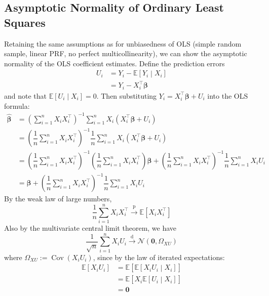 \documentclass[11pt]{report} %
\begin{document}
\subsection{Asymptotic Normality of Ordinary Least Squares}

Retaining the same assumptions as for unbiasedness of OLS (simple random sample, linear PRF, no perfect multicollinearity), we can show the asymptotic normality of the OLS coefficient estimates. Define the prediction errors
\begin{align}
U_{i} &= Y_{i} - \mathbb{E}\left[Y_{i}\middle| X_{i}\right] \\
&= Y_{i} - X_{i}^{\top}\boldsymbol{\beta}
\end{align}
and note that $\mathbb{E}\left[U_{i}\middle| X_{i}\right] = 0$. Then substituting $Y_{i} = X_{i}^{\top}\boldsymbol{\beta} + U_{i}$ into the OLS formula:
\begin{align}
\widehat{\boldsymbol{\beta}} &= \left(\sum_{i=1}^{n}X_{i}X_{i}^{\top}\right)^{-1}\sum_{i=1}^{n}X_{i}\left(X_{i}^{\top}\boldsymbol{\beta}+U_{i}\right) \\
&= \left(\dfrac{1}{n}\sum_{i=1}^{n}X_{i}X_{i}^{\top}\right)^{-1}\dfrac{1}{n}\sum_{i=1}^{n}X_{i}\left(X_{i}^{\top}\boldsymbol{\beta}+U_{i}\right) \\
&= \left(\dfrac{1}{n}\sum_{i=1}^{n}X_{i}X_{i}^{\top}\right)^{-1}\left(\dfrac{1}{n}\sum_{i=1}^{n}X_{i}X_{i}^{\top}\right)\boldsymbol{\beta}+\left(\dfrac{1}{n}\sum_{i=1}^{n}X_{i}X_{i}^{\top}\right)^{-1}\dfrac{1}{n}\sum_{i=1}^{n}X_{i}U_{i} \\
&= \boldsymbol{\beta}+\left(\dfrac{1}{n}\sum_{i=1}^{n}X_{i}X_{i}^{\top}\right)^{-1}\dfrac{1}{n}\sum_{i=1}^{n}X_{i}U_{i}
\end{align}
By the weak law of large numbers,
\begin{equation}
\dfrac{1}{n}\sum_{i=1}^{n}X_{i}X_{i}^{\top} \overset{\mathrm{p}}{\to} \mathbb{E}\left[X_{i}X_{i}^{\top}\right]
\end{equation}
Also by the multivariate central limit theorem, we have
\begin{equation}
\dfrac{1}{\sqrt{n}}\sum_{i = 1}^{n}X_{i}U_{i} \overset{\mathrm{d}}{\to} \mathcal{N}\left(\mathbf{0}, \Omega_{XU}\right)
\end{equation}
where $\Omega_{XU} := \operatorname{Cov}\left(X_{i}U_{i}\right)$, since by the law of iterated expectations:
\begin{align}
\mathbb{E}\left[X_{i}U_{i}\right] &= \mathbb{E}\left[\mathbb{E}\left[X_{i}U_{i}\middle| X_{i}\right]\right] \\
&= \mathbb{E}\left[X_{i}\mathbb{E}\left[U_{i}\middle| X_{i}\right]\right] \\
&= \mathbf{0}
\end{align}
\end{document}
